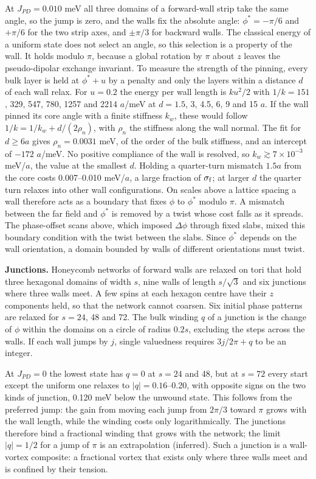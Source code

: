 At \(J_{PD}=0.010\) meV all three domains of a forward-wall strip take
the same angle, so the jump is zero, and the walls fix the absolute
angle: \(\phi^*=-\pi/6\) and \(+\pi/6\) for the two strip axes, and
\(\pm\pi/3\) for backward walls. The classical energy of a uniform
state does not select an angle, so this selection is a property of the
wall. It holds modulo \(\pi\), because a global rotation by \(\pi\)
about \(z\) leaves the pseudo-dipolar exchange invariant. To measure the
strength of the pinning, every bulk layer is held at \(\phi^*+u\) by a
penalty and only the layers within a distance \(d\) of each wall relax.
For \(u=0.2\) the energy per wall length is \(ku^2/2\) with
\(1/k=151\), 329, 547, 780, 1257 and 2214 \(a\)/meV at \(d=1.5\), 3,
4.5, 6, 9 and 15 \(a\). If the wall pinned its core angle with a finite
stiffness \(k_w\), these would follow \(1/k=1/k_w+d/(2\rho_n)\), with
\(\rho_n\) the stiffness along the wall normal. The fit for
\(d\ge6a\) gives \(\rho_n=0.0031\) meV, of the order of the bulk
stiffness, and an intercept of \(-172\) \(a\)/meV. No positive
compliance of the wall is resolved, so \(k_w\gtrsim7\times10^{-3}\)
meV/\(a\), the value at the smallest \(d\). Holding a quarter-turn
mismatch \(1.5a\) from the core costs 0.007--0.010 meV/\(a\), a large
fraction of \(\sigma_{\rm f}\); at larger \(d\) the quarter turn relaxes
into other wall configurations. On scales above a lattice spacing a wall
therefore acts as a boundary that fixes \(\phi\) to \(\phi^*\) modulo
\(\pi\). A mismatch between the far field and \(\phi^*\) is removed by
a twist whose cost falls as it spreads. The phase-offset scans above,
which imposed \(\Delta\phi\) through fixed slabs, mixed this boundary
condition with the twist between the slabs. Since \(\phi^*\) depends on
the wall orientation, a domain bounded by walls of different
orientations must twist.

\textbf{Junctions.} Honeycomb networks of forward walls are relaxed on
tori that hold three hexagonal domains of width \(s\), nine walls of
length \(s/\sqrt3\) and six junctions where three walls meet. A few
spins at each hexagon centre have their \(z\) components held, so that
the network cannot coarsen. Six initial phase patterns are relaxed for
\(s=24\), 48 and 72. The bulk winding \(q\) of a junction is the change
of \(\phi\) within the domains on a circle of radius \(0.2s\), excluding
the steps across the walls. If each wall jumps by \(j\), single
valuedness requires \(3j/2\pi+q\) to be an integer.

At \(J_{PD}=0\) the lowest state has \(q=0\) at \(s=24\) and 48, but at
\(s=72\) every start except the uniform one relaxes to
\(|q|=0.16\)--0.20, with
opposite signs on the two kinds of junction, 0.120 meV below the
unwound state. This follows from the preferred jump: the gain from
moving each jump from \(2\pi/3\) toward \(\pi\) grows with the wall
length, while the winding costs only logarithmically. The junctions
therefore bind a fractional winding that grows with the network; the
limit \(|q|=1/2\) for a jump of \(\pi\) is an extrapolation (inferred).
Such a junction is a wall-vortex composite: a fractional vortex that
exists only where three walls meet and is confined by their tension.

